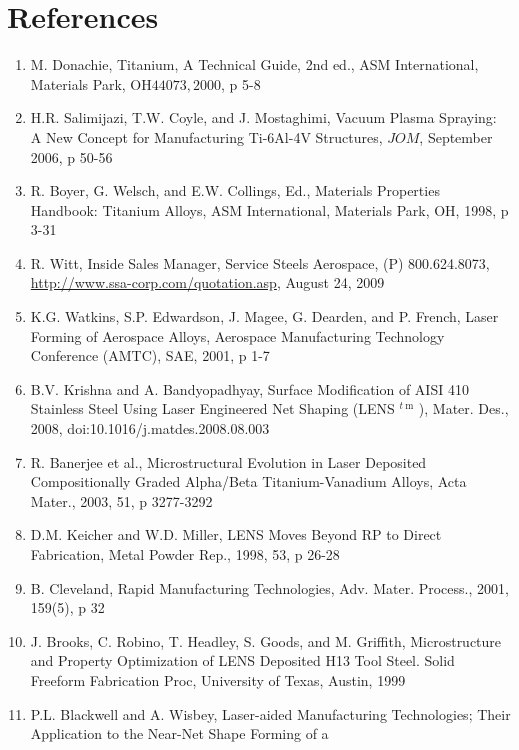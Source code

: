 \documentclass[10pt]{article}
\begin{document}
\section*{References}
\begin{enumerate}
  \item M. Donachie, Titanium, A Technical Guide, 2nd ed., ASM International, Materials Park, $\mathrm{OH} 44073,2000$, p 5-8

  \item H.R. Salimijazi, T.W. Coyle, and J. Mostaghimi, Vacuum Plasma Spraying: A New Concept for Manufacturing Ti-6Al-4V Structures, $J O M$, September 2006, p 50-56

  \item R. Boyer, G. Welsch, and E.W. Collings, Ed., Materials Properties Handbook: Titanium Alloys, ASM International, Materials Park, OH, 1998, p 3-31

  \item R. Witt, Inside Sales Manager, Service Steels Aerospace, (P) 800.624.8073, \href{http://www.ssa-corp.com/quotation.asp}{http://www.ssa-corp.com/quotation.asp}, August 24, 2009

  \item K.G. Watkins, S.P. Edwardson, J. Magee, G. Dearden, and P. French, Laser Forming of Aerospace Alloys, Aerospace Manufacturing Technology Conference (AMTC), SAE, 2001, p 1-7

  \item B.V. Krishna and A. Bandyopadhyay, Surface Modification of AISI 410 Stainless Steel Using Laser Engineered Net Shaping (LENS ${ }^{t \mathrm{~m}}$ ), Mater. Des., 2008, doi:10.1016/j.matdes.2008.08.003

  \item R. Banerjee et al., Microstructural Evolution in Laser Deposited Compositionally Graded Alpha/Beta Titanium-Vanadium Alloys, Acta Mater., 2003, 51, p 3277-3292

  \item D.M. Keicher and W.D. Miller, LENS Moves Beyond RP to Direct Fabrication, Metal Powder Rep., 1998, 53, p 26-28

  \item B. Cleveland, Rapid Manufacturing Technologies, Adv. Mater. Process., 2001, 159(5), p 32

  \item J. Brooks, C. Robino, T. Headley, S. Goods, and M. Griffith, Microstructure and Property Optimization of LENS Deposited H13 Tool Steel. Solid Freeform Fabrication Proc, University of Texas, Austin, 1999

  \item P.L. Blackwell and A. Wisbey, Laser-aided Manufacturing Technologies; Their Application to the Near-Net Shape Forming of a

\end{enumerate}
\end{document}
